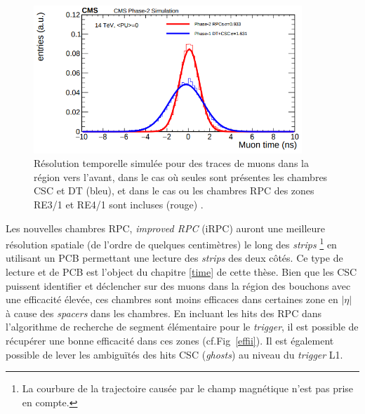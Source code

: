 \begin{itemize}[label=$\bullet$]
	\begin{figure}[ht!]
		\centering
		\includegraphics[width=0.90\textwidth]{RPC/intrasec.png}
		\captionsetup{type=figure}\caption{Résolution temporelle simulée pour des traces de muons dans la région vers l'avant, dans le cas où seules sont présentes les chambres CSC et DT (bleu), et dans le cas ou les chambres RPC des zones RE3/1 et RE4/1 sont incluses (rouge) \cite{Lourenco:2283189}.}
		\label{intrasec}
	\end{figure}
	Les nouvelles chambres RPC, \textit{improved RPC} (iRPC) auront une meilleure résolution spatiale (de l'ordre de quelques centimètres) le long des \textit{strips} \footnote{La courbure de la trajectoire causée par le champ magnétique n'est pas prise en compte.} en utilisant un PCB permettant une lecture des \textit{strips} des deux côtés. Ce type de lecture et de PCB est l'object du chapitre \ref{time} de cette thèse.
	\newpage
	Bien que les CSC puissent identifier et déclencher sur des muons dans la région des bouchons avec une efficacité élevée, ces chambres sont moins efficaces dans certaines zone en $|\eta|$ à cause des \textit{spacers} dans les chambres. En incluant les hits des RPC dans l'algorithme de recherche de segment élémentaire pour le \textit{trigger}, il est possible de récupérer une bonne efficacité dans ces zones (cf.Fig~\ref{effii}). Il est également possible de lever les ambiguïtés des hits CSC (\textit{ghosts})  au niveau du \textit{trigger} L1.
	

\end{itemize}
